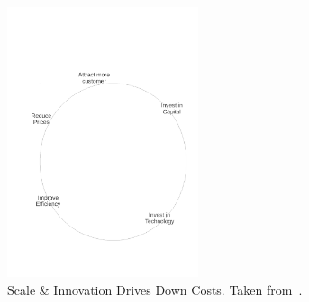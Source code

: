 

\begin{figure}
	\centering
	\includegraphics[width=0.5\textwidth]{./Figures/ScaleInnovation.pdf}
	\caption{Scale \& Innovation Drives Down Costs. Taken from~\cite{gavin2014ams}.}
	\label{fig:ScaleInnovation}
\end{figure}

